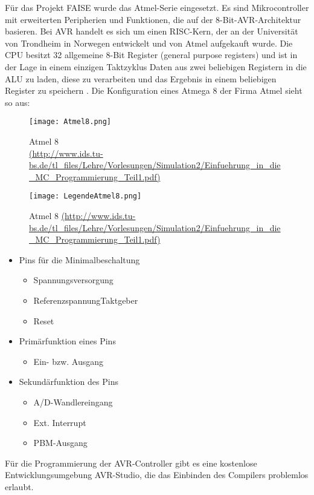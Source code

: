 F\"ur das Projekt FAISE wurde das Atmel-Serie eingesetzt. Es sind Mikrocontroller mit erweiterten Peripherien und Funktionen, die auf der 8-Bit-AVR-Architektur basieren. Bei AVR handelt es sich um einen RISC-Kern, der an der Universit\"at von Trondheim in Norwegen entwickelt und von Atmel aufgekauft wurde. Die CPU besitzt 32 allgemeine 8-Bit Register (general purpose registers) und ist in der Lage in einem einzigen Taktzyklus Daten aus zwei beliebigen Registern in die ALU zu laden, diese zu verarbeiten und das Ergebnis in einem beliebigen Register zu speichern \cite{Viktor:Seib:2014:Online}. Die Konfiguration eines Atmega 8 der Firma Atmel sieht so aus:
\begin{figure}[h!]
	\centering
		\texttt{[image: Atmel8.png]}
	\caption{Atmel 8 \\ \url{(http://www.ids.tu-bs.de/tl\_files/Lehre/Vorlesungen/Simulation2/Einfuehrung\_in\_die\_MC\_Programmierung\_Teil1.pdf)}}
	\label{Atmel 8}
\end{figure}
\begin{figure}[h!]
	\centering
		\texttt{[image: LegendeAtmel8.png]}
	\caption{Atmel 8 \url{(http://www.ids.tu-bs.de/tl\_files/Lehre/Vorlesungen/Simulation2/Einfuehrung\_in\_die\_MC\_Programmierung\_Teil1.pdf)}}
	\label{Legende Atmel8}
\end{figure}
\begin{itemize}
\item Pins f\"ur die Minimalbeschaltung
\begin{itemize}
          \item Spannungsversorgung
          \item ReferenzspannungTaktgeber
          \item Reset      
					\end{itemize}
\item Prim\"arfunktion eines Pins
\begin{itemize}
          \item Ein- bzw. Ausgang
					\end{itemize}
\item Sekund\"arfunktion des Pins
\begin{itemize}
          \item A/D-Wandlereingang
          \item Ext. Interrupt
          \item PBM-Ausgang   
\end{itemize}
\end{itemize}
F\"ur die Programmierung der AVR-Controller gibt es eine kostenlose Entwicklungsumgebung AVR-Studio, die das Einbinden des Compilers problemlos erlaubt.

